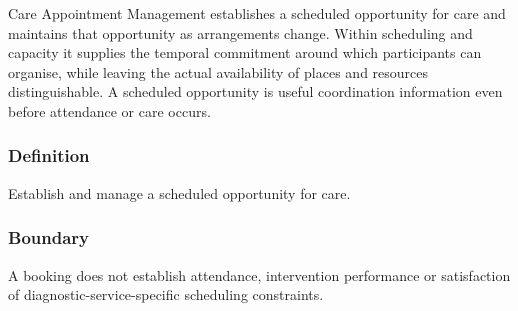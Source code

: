 Care Appointment Management establishes a scheduled opportunity for care and maintains that opportunity as arrangements change. Within scheduling and capacity it supplies the temporal commitment around which participants can organise, while leaving the actual availability of places and resources distinguishable. A scheduled opportunity is useful coordination information even before attendance or care occurs.

\subsubsection*{Definition}

Establish and manage a scheduled opportunity for care.

\subsubsection*{Boundary}

A booking does not establish attendance, intervention performance or satisfaction of diagnostic-service-specific scheduling constraints.

